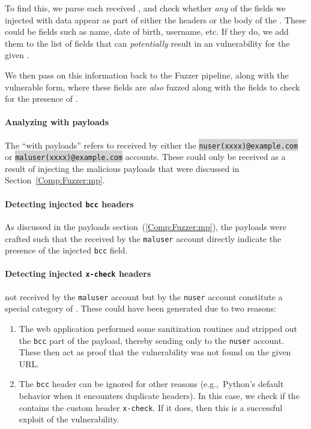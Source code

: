 To find this, we parse each received \email, and check whether \emph{any} of the fields we injected with data appear as part of either the headers or the body of the \email. These could be fields such as name, date of birth, username, etc. If they do, we add them to the list of fields that can \emph{potentially} result in an \ehi vulnerability for the given \email. 

We then pass on this information back to the Fuzzer pipeline, along with the vulnerable form, where these fields are \emph{also} fuzzed along with the \email fields to check for the presence of \ehi.

\paragraph{Analyzing \email with payloads}
The ``\emails with payloads'' refers to \emails received by either the \colorbox{lightgray}{\lstinline{nuser(xxxx)@example.com}} or \colorbox{lightgray}{\lstinline{maluser(xxxx)@example.com}} accounts. These \emails could only be received as a result of injecting the malicious payloads that were discussed in Section~\ref{Comp:Fuzzer:mp}. 

\paragraph{Detecting injected \texttt{bcc} headers}
As discussed in the payloads section~(\ref{Comp:Fuzzer:mp}), the payloads were crafted such that the \emails received by the \texttt{maluser} account directly indicate the presence of the injected \texttt{bcc} field. 

\label{analyze:detect_x_check}
\paragraph{Detecting injected \texttt{x-check} headers}
\Emails not received by the \texttt{maluser} account but by the \texttt{nuser} account constitute a special category of \emails.
These \emails could have been generated due to two reasons:
\begin{enumerate}
	\item The web application performed some sanitization routines and stripped out the \texttt{bcc} part of the payload, thereby sending \emails only to the \texttt{nuser} account. These \emails then act as proof that the vulnerability was not found on the given URL.
	\item The \texttt{bcc} header can be ignored for other reasons (e.g.,\ Python's default behavior when it encounters duplicate headers). In this case, we check if the \email contains the custom header \texttt{x-check}. If it does, then this is a successful exploit of the vulnerability.
\end{enumerate}
